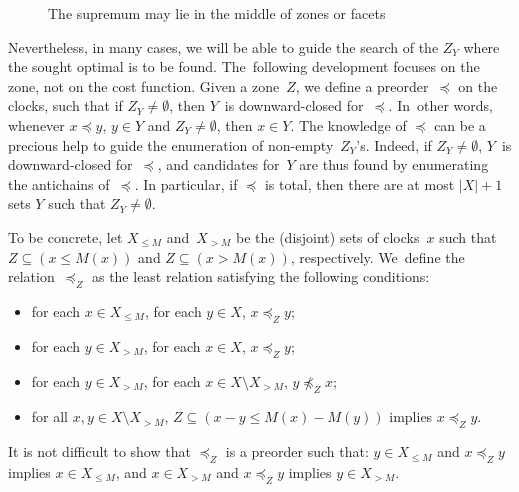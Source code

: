 \begin{figure}[tb]
{
}
\caption{The supremum may lie in the middle of zones or facets}
\label{fig:examples}
\end{figure}

Nevertheless, in many cases, we will be able to guide the search of the $Z_Y$
where the sought optimal is to be found.
The~following development
focuses on the zone, not on the cost function. Given a zone~$Z$, we define a
preorder~$\preceq$ on the clocks, such that if $Z_Y \neq \emptyset$, then
$Y$~is downward-closed for~$\preceq$. In~other words, whenever $x \preceq y$,
$y \in Y$ and $Z_Y \neq \emptyset$, then $x \in Y$. The knowledge of $\preceq$
can be a precious help to guide the enumeration of non-empty~$Z_Y$'s.
Indeed, if $Z_Y \neq \emptyset$, $Y$~is downward-closed for~$\preceq$, and
candidates for~$Y$ are thus found by enumerating the antichains of~$\preceq$.
In particular, if $\preceq$ is total, then there are at most $|X|+1$ sets $Y$
such that $Z_Y \neq \emptyset$.

To be concrete, 
let $X_{\le M}$ and~$X_{>M}$ be the (disjoint) sets of clocks~$x$ such that $Z
\subseteq (x \le M(x))$ and ${Z \subseteq (x>M(x))}$, respectively.
We~define the relation~$\preceq_Z$ as the
least
relation satisfying the following conditions:
\begin{itemize}
\item for each $x \in X_{\le M}$, for each $y \in X$, $x \preceq_Z y$;
\item for each $y \in X_{>M}$, for each $x \in X$, $x \preceq_Z y$;
\item for each $y \in X_{>M}$, for each $x \in X \setminus X_{>M}$, $y
  \not\preceq_Z x$;
\item for all $x,y \in X \setminus X_{>M}$, $Z \subseteq (x-y \le
  M(x)-M(y))$ implies $x \preceq_Z y$.
\end{itemize}
It is not difficult to show that $\preceq_Z$ is a preorder such that:
$y \in X_{\le M}$ and $x \preceq_Z y$ implies $x \in X_{\le M}$, and
$x \in X_{>M}$ and $x \preceq_Z y$ implies $y \in X_{>M}$.

